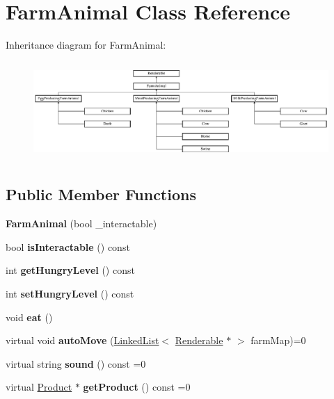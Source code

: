 \hypertarget{class_farm_animal}{}\section{Farm\+Animal Class Reference}
\label{class_farm_animal}
Inheritance diagram for Farm\+Animal\+:\begin{figure}[H]
\begin{center}
\leavevmode
\includegraphics[height=3.776493cm]{class_farm_animal}
\end{center}
\end{figure}
\subsection*{Public Member Functions}
\begin{DoxyCompactItemize}
\item 
\mbox{\label{class_farm_animal_a511313a258430a03a9328b66c325731c}} 
{\bfseries Farm\+Animal} (bool \+\_\+interactable)
\item 
\mbox{\label{class_farm_animal_ab3bbdd721661612905812389b2379b88}} 
bool {\bfseries is\+Interactable} () const
\item 
\mbox{\label{class_farm_animal_aa00afec2fda5a9b844af6ad5430a57b5}} 
int {\bfseries get\+Hungry\+Level} () const
\item 
\mbox{\label{class_farm_animal_ab46f5f33a7b94b907386cc2303000d5e}} 
int {\bfseries set\+Hungry\+Level} () const
\item 
\mbox{\label{class_farm_animal_ad805436da6500547986a78f986f85904}} 
void {\bfseries eat} ()
\item 
\mbox{\label{class_farm_animal_aefed76123ec08344a760c3c2647645bc}} 
virtual void {\bfseries auto\+Move} (\mbox{\hyperlink{class_linked_list}{Linked\+List}}$<$ \mbox{\hyperlink{class_renderable}{Renderable}} $\ast$ $>$ farm\+Map)=0
\item 
\mbox{\label{class_farm_animal_acfce9920341361cb864ff74b62d6d535}} 
virtual string {\bfseries sound} () const =0
\item 
\mbox{\label{class_farm_animal_a29ea67c5fc79c2cac5d62e73b2b91436}} 
virtual \mbox{\hyperlink{class_product}{Product}} $\ast$ {\bfseries get\+Product} () const =0
\end{DoxyCompactItemize}
